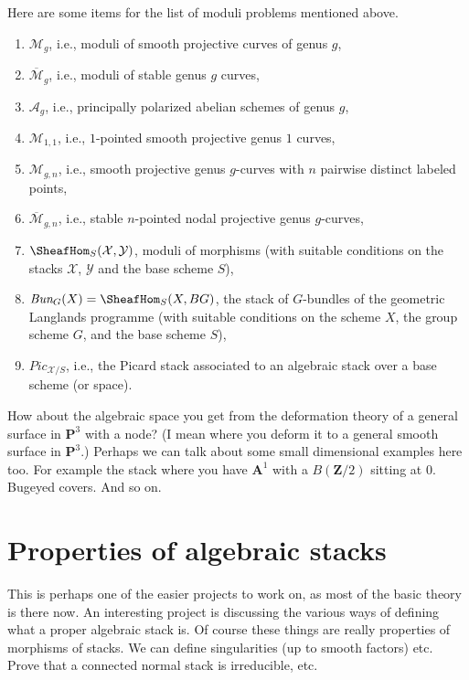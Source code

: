 \medskip\noindent
Here are some items for the list of moduli problems mentioned above.
\begin{enumerate}
\item $\mathcal{M}_g$, i.e., moduli of smooth projective curves of genus $g$,
\item $\overline{\mathcal{M}}_g$, i.e., moduli of stable genus $g$ curves,
\item $\mathcal{A}_g$,
i.e., principally polarized abelian schemes of genus $g$,
\item $\mathcal{M}_{1, 1}$, i.e.,
$1$-pointed smooth projective genus $1$ curves,
\item $\mathcal{M}_{g, n}$, i.e., smooth projective genus $g$-curves
with $n$ pairwise distinct labeled points,
\item $\overline{\mathcal{M}}_{g, n}$, i.e.,
stable $n$-pointed nodal projective genus $g$-curves,
\item $\SheafHom_S(\mathcal{X}, \mathcal{Y})$, moduli of morphisms
(with suitable conditions on the stacks $\mathcal{X}$, $\mathcal{Y}$
and the base scheme $S$),
\item $\textit{Bun}_G(X) = \SheafHom_S(X, BG)$, the stack of $G$-bundles
of the geometric Langlands programme (with suitable conditions on the scheme
$X$, the group scheme $G$, and the base scheme $S$),
\item $\textit{Pic}_{\mathcal{X}/S}$, i.e., the Picard stack associated
to an algebraic stack over a base scheme (or space).
\end{enumerate}
How about the algebraic space you get from the deformation theory of
a general surface in $\mathbf{P}^3$ with a node? (I mean where you deform
it to a general smooth surface in $\mathbf{P}^3$.)
Perhaps we can talk about some small dimensional examples here too.
For example the stack where you have $\mathbf{A}^1$ with a $B(\mathbf{Z}/2)$
sitting at $0$. Bugeyed covers. And so on.


\section{Properties of algebraic stacks}
\label{section-stacks-properties}

\noindent
This is perhaps one of the easier projects to work on, as most of the
basic theory is there now. An interesting project is discussing the
various ways of defining what a proper algebraic stack is.
Of course these things are really properties of morphisms of stacks.
We can define singularities (up to smooth factors) etc. Prove that a
connected normal stack is irreducible, etc.


